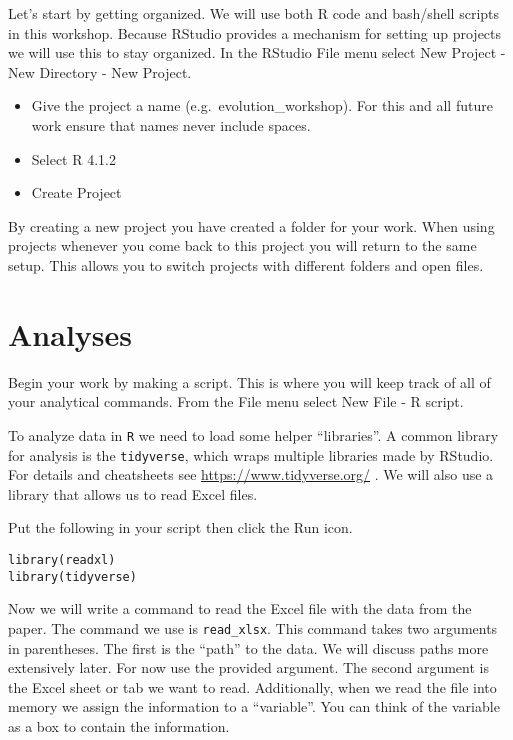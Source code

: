 \documentclass[
]{book}
\providecommand{\tightlist}{%
  \setlength{\itemsep}{0pt}\setlength{\parskip}{0pt}}
\begin{document}
Let's start by getting organized.
We will use both R code and bash/shell scripts in this workshop.
Because RStudio provides a mechanism for setting up projects we will use this to stay organized.
In the RStudio File menu select New Project - New Directory - New Project.

\begin{itemize}
\tightlist
\item
  Give the project a name (e.g.~evolution\_workshop). For this and all future work ensure that names never include spaces.
\item
  Select R 4.1.2
\item
  Create Project
\end{itemize}

By creating a new project you have created a folder for your work.
When using projects whenever you come back to this project you will return to the same setup.
This allows you to switch projects with different folders and open files.

\hypertarget{analyses}{%
\section{Analyses}\label{analyses}}

Begin your work by making a script.
This is where you will keep track of all of your analytical commands.
From the File menu select New File - R script.

To analyze data in \texttt{R} we need to load some helper ``libraries''. A common library for analysis is the \texttt{tidyverse}, which wraps multiple libraries made by RStudio. For details and cheatsheets see \url{https://www.tidyverse.org/} . We will also use a library that allows us to read Excel files.

Put the following in your script then click the Run icon.

\begin{verbatim}
library(readxl)
library(tidyverse)
\end{verbatim}

Now we will write a command to read the Excel file with the data from the paper.
The command we use is \texttt{read\_xlsx}.
This command takes two arguments in parentheses.
The first is the ``path'' to the data.
We will discuss paths more extensively later.
For now use the provided argument.
The second argument is the Excel sheet or tab we want to read.
Additionally, when we read the file into memory we assign the information to a ``variable''.
You can think of the variable as a box to contain the information.
\end{document}

